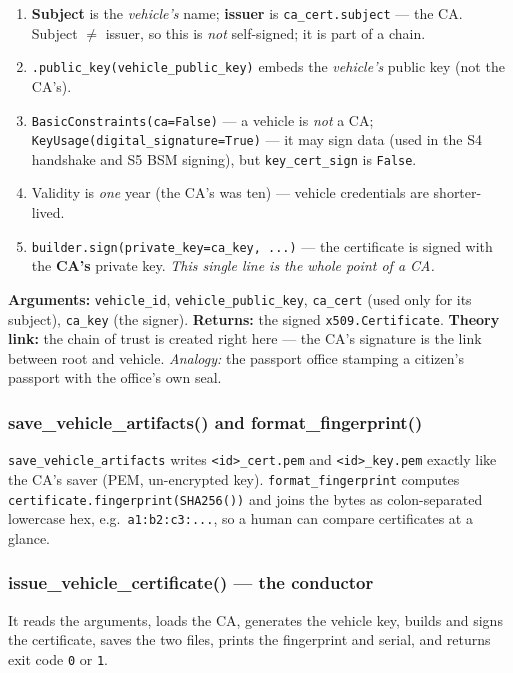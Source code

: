 \documentclass[11pt,a4paper]{article}
\begin{document}
\begin{enumerate}
  \item \textbf{Subject} is the \emph{vehicle's} name; \textbf{issuer} is
        \texttt{ca\_cert.subject} --- the CA. Subject $\ne$ issuer, so this is
        \emph{not} self-signed; it is part of a chain.
  \item \texttt{.public\_key(vehicle\_public\_key)} embeds the \emph{vehicle's}
        public key (not the CA's).
  \item \texttt{BasicConstraints(ca=False)} --- a vehicle is \emph{not} a CA;
        \texttt{KeyUsage(digital\_signature=True)} --- it may sign data (used in
        the S4 handshake and S5 BSM signing), but \texttt{key\_cert\_sign} is
        \texttt{False}.
  \item Validity is \emph{one} year (the CA's was ten) --- vehicle credentials
        are shorter-lived.
  \item \texttt{builder.sign(private\_key=ca\_key, ...)} --- the certificate is
        signed with the \textbf{CA's} private key. \emph{This single line is the
        whole point of a CA.}
\end{enumerate}
\textbf{Arguments:} \texttt{vehicle\_id}, \texttt{vehicle\_public\_key},
\texttt{ca\_cert} (used only for its subject), \texttt{ca\_key} (the signer).
\textbf{Returns:} the signed \texttt{x509.Certificate}.
\textbf{Theory link:} the chain of trust is created right here --- the CA's
signature is the link between root and vehicle. \emph{Analogy:} the passport
office stamping a citizen's passport with the office's own seal.

\subsubsection*{save\_vehicle\_artifacts() and format\_fingerprint()}
\texttt{save\_vehicle\_artifacts} writes \texttt{<id>\_cert.pem} and
\texttt{<id>\_key.pem} exactly like the CA's saver (PEM, un-encrypted key).
\texttt{format\_fingerprint} computes \texttt{certificate.fingerprint(SHA256())}
and joins the bytes as colon-separated lowercase hex, e.g.\
\texttt{a1:b2:c3:...}, so a human can compare certificates at a glance.

\subsubsection*{issue\_vehicle\_certificate() --- the conductor}
It reads the arguments, loads the CA, generates the vehicle key, builds and signs
the certificate, saves the two files, prints the fingerprint and serial, and
returns exit code \texttt{0} or \texttt{1}.
\end{document}
